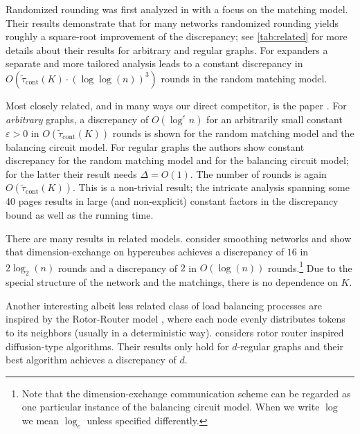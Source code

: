\documentclass[twoside,leqno]{article}
\DeclareMathOperator{\1}{\mathbf{1}}
\newcommand{\tauspectral}[1]{{\widetilde{\tau}}_{\mathrm{cont}}\left({#1}\right)}
\numberwithin{equation}{section}
\let\epsilon\varepsilon
\begin{document}
\medskip


Randomized rounding was first analyzed in \cite{DBLP:conf/stoc/FriedrichS09} with a focus on the matching model.
Their results demonstrate that for many networks randomized rounding yields roughly a square-root improvement of the discrepancy; see \cref{tab:related} for more details about their results for arbitrary and regular graphs.
For expanders a separate and more tailored analysis leads to a constant discrepancy in $O(\tauspectral{K} \cdot(\log \log(n))^3)$ rounds in the random matching model.

Most closely related, and in many ways our direct competitor, is the paper \cite{DBLP:conf/focs/SauerwaldS12}. For \emph{arbitrary} graphs, a discrepancy of $O(\log^{\epsilon} n)$ for an arbitrarily small constant $\epsilon > 0$ in $O(\tauspectral{K})$ rounds is shown  for the random matching model and
the balancing circuit model.
For regular graphs the authors show constant discrepancy for the random matching model and for the balancing circuit model; for the latter their result needs $\Delta=O(1)$. The number of rounds is again $O(\tauspectral{K})$.
This is a non-trivial result;  the intricate analysis spanning some 40 pages results in  large (and non-explicit) constant factors in the discrepancy bound as well as the running time.

\medskip
There are many results in related models.
\cite{MS10,MS09} consider smoothing networks and 
 show that dimension-exchange on hypercubes achieves a discrepancy of $16$ in $2 \log_2 (n)$ rounds and a discrepancy of $2$ in $O(\log(n))$ rounds.\footnote{Note that the dimension-exchange communication scheme can be regarded as one particular instance of the balancing circuit model. When we write $\log$ we mean $\log_e$ unless specified differently.}
Due to the special structure of the network and the matchings, there is no dependence on $K$. 

Another interesting albeit less related class of load balancing processes are inspired by the Rotor-Router model \cite{DBLP:journals/rsa/CooperDFS10,DBLP:journals/cpc/CooperS06}, where each node evenly distributes tokens to its neighbors (usually in a deterministic way). 
\cite{DBLP:journals/talg/BerenbrinkKKMU19} considers rotor router inspired diffusion-type algorithms. Their results only hold for $d$-regular graphs and their best algorithm achieves  a discrepancy of $d$.
\end{document}
